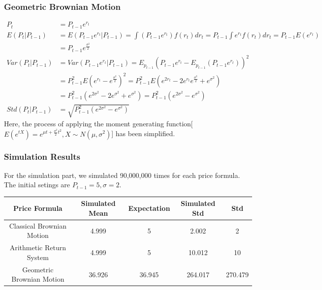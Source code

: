 \documentclass[a4paper,12pt]{article}
\begin{document}
\subsubsection*{Geometric Brownian Motion}
\begin{displaymath}
    \begin{split}
        P_{t} &= P_{t-1}e^{r_{t}}\\
        E(P_{t}|P_{t-1}) &= E(P_{t-1}e^{r_{t}}|P_{t-1}) = \int (P_{t-1}e^{r_{t}})f(r_{t})dr_{t} = P_{t-1}\int e^{r_{t}}f(r_{t})dr_{t} = P_{t-1}E(e^{r_{t}}) \\
                        & = P_{t-1} e^{\frac{\sigma^{2}}{2}}\\
        Var(P_t|P_{t-1}) &= Var(P_{t-1}e^{r_{t}}|P_{t-1}) = E_{p_{t-1}}(P_{t-1}e^{r_{t}}-E_{p_{t-1}}(P_{t-1}e^{r_{t}}))^{2}\\
                        &= P_{t-1}^{2}E(e^{r_{t}}-e^{\frac{\sigma^{2}}{2}})^{2} = P_{t-1}^{2}E(e^{2r_t}-2e^{r_t}e^{\frac{\sigma^{2}}{2}}+e^{\sigma^{2}})\\
                        &= P_{t-1}^{2}(e^{2\sigma^{2}}-2e^{\sigma^{2}}+e^{\sigma^{2}}) = P^{2}_{t-1}(e^{2\sigma^{2}}-e^{\sigma^{2}})\\
        Std(P_t|P_{t-1}) & = \sqrt{P^{2}_{t-1}(e^{2\sigma^{2}}-e^{\sigma^{2}})}
    \end{split}
\end{displaymath}
Here, the process of applying the moment generating function[$E(e^{tX}) = e^{\mu t+\frac{\sigma^{2}}{2}t^2},X\sim N(\mu,\sigma^{2})$] has been simplified.

\subsubsection*{Simulation Results}
For the simulation part, we simulated 90,000,000 times for each price formula. The initial setings are $P_{t-1} = 5,\sigma=2$.
\begin{center}
    \begin{tabular}{ c|c|c|c|c }
     \hline
     Price Formula & Simulated Mean & Expectation & Simulated Std & Std \\ 
     \hline
     Classical Brownian Motion& 4.999&5 & 2.002 &2\\ 
     Arithmetic Return System & 4.999&5 &10.012 &10\\ 
     Geometric Brownian Motion & 36.926& 36.945 & 264.017&270.479 \\ 
     \hline
    \end{tabular}
    \end{center}
\newpage
\end{document}

